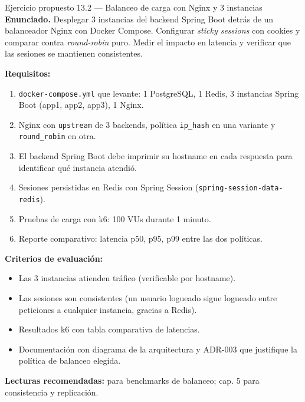 \documentclass[11pt,a4paper,openany]{book}
\begin{document}
\begin{cajaejercicio}{Ejercicio propuesto 13.2 --- Balanceo de carga con Nginx y 3 instancias}
\textbf{Enunciado.} Desplegar 3 instancias del backend Spring Boot
detrás de un balanceador Nginx con Docker Compose. Configurar
\emph{sticky sessions} con cookies y comparar contra
\emph{round-robin} puro. Medir el impacto en latencia y verificar
que las sesiones se mantienen consistentes.

\textbf{Requisitos:}
\begin{enumerate}
\item \texttt{docker-compose.yml} que levante: 1 PostgreSQL,
1 Redis, 3 instancias Spring Boot (app1, app2, app3), 1 Nginx.
\item Nginx con \texttt{upstream} de 3 backends, política
\texttt{ip\_hash} en una variante y \texttt{round\_robin} en otra.
\item El backend Spring Boot debe imprimir su hostname en cada
respuesta para identificar qué instancia atendió.
\item Sesiones persistidas en Redis con Spring Session
(\texttt{spring-session-data-redis}).
\item Pruebas de carga con k6: 100 VUs durante 1 minuto.
\item Reporte comparativo: latencia p50, p95, p99 entre las dos
políticas.
\end{enumerate}

\textbf{Criterios de evaluación:}
\begin{itemize}
\item Las 3 instancias atienden tráfico (verificable por hostname).
\item Las sesiones son consistentes (un usuario logueado sigue
logueado entre peticiones a cualquier instancia, gracias a Redis).
\item Resultados k6 con tabla comparativa de latencias.
\item Documentación con diagrama de la arquitectura y ADR-003 que
justifique la política de balanceo elegida.
\end{itemize}

\textbf{Lecturas recomendadas:}
\cite{kleppmann2017designing} para benchmarks de balanceo;
\cite{kleppmann2017designing} cap. 5 para consistencia y replicación.
\end{cajaejercicio}

\end{document}
